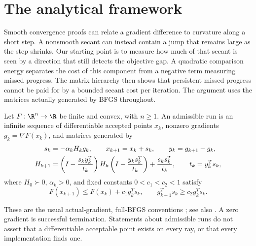 \section{The analytical framework}\label{art:energy}

Smooth convergence proofs can relate a gradient difference to curvature along
a short step. A nonsmooth secant can instead contain a jump that remains large
as the step shrinks. Our starting point is to measure how much of that secant
is seen by a direction that still detects the objective gap. A quadratic
comparison energy separates the cost of this component from a negative term
measuring missed progress. The matrix hierarchy then shows that persistent
missed progress cannot be paid for by a bounded secant cost per iteration.
The argument uses the matrices actually generated by BFGS throughout.

\begin{definition}\label{art:admissible}
Let $F:\R^n\to\R$ be finite and convex, with $n\ge1$.
An admissible run is an infinite sequence of differentiable accepted points
$x_k$, nonzero gradients $g_k=\nabla F(x_k)$, and matrices generated by
\begin{align}
 s_k&=-\alpha_kH_kg_k,\qquad x_{k+1}=x_k+s_k,
       \qquad y_k=g_{k+1}-g_k,\notag\\
 H_{k+1}&=\left(I-\frac{s_ky_k^T}{t_k}\right)
 H_k\left(I-\frac{y_ks_k^T}{t_k}\right)
       +\frac{s_ks_k^T}{t_k},\qquad t_k=y_k^Ts_k,\label{art:update}
\end{align}
where $H_0\succ0$, $\alpha_k>0$, and fixed constants $0<c_1<c_2<1$ satisfy
\begin{equation}\label{art:aw}
 F(x_{k+1})\le F(x_k)+c_1g_k^Ts_k,
 \qquad g_{k+1}^Ts_k\ge c_2g_k^Ts_k.
\end{equation}
\end{definition}
These are the usual actual-gradient, full-BFGS conventions
\cite{LO}; see also .
A zero gradient is successful termination. Statements about
admissible runs do not assert that a differentiable acceptable point exists on
every ray, or that every implementation finds one.

